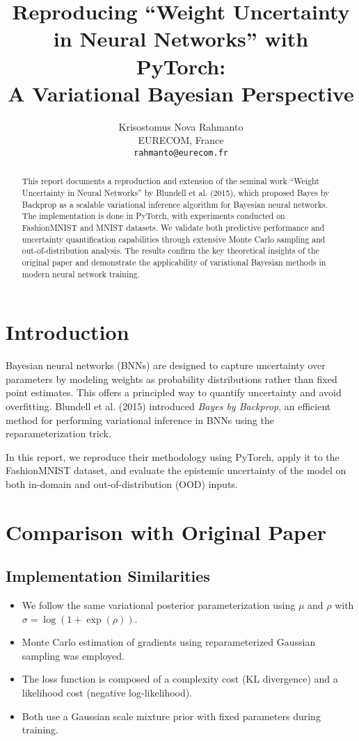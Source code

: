 \documentclass{article}
\title{Reproducing ``Weight Uncertainty in Neural Networks'' with PyTorch: \\ A Variational Bayesian Perspective}
\author{
  Krisostomus Nova Rahmanto \\
  EURECOM, France \\
  \texttt{rahmanto@eurecom.fr} \\
}
\begin{document}
\maketitle

\begin{abstract}
This report documents a reproduction and extension of the seminal work ``Weight Uncertainty in Neural Networks'' by Blundell et al. (2015), which proposed Bayes by Backprop as a scalable variational inference algorithm for Bayesian neural networks. The implementation is done in PyTorch, with experiments conducted on FashionMNIST and MNIST datasets. We validate both predictive performance and uncertainty quantification capabilities through extensive Monte Carlo sampling and out-of-distribution analysis. The results confirm the key theoretical insights of the original paper and demonstrate the applicability of variational Bayesian methods in modern neural network training.
\end{abstract}

\section{Introduction}

Bayesian neural networks (BNNs) are designed to capture uncertainty over parameters by modeling weights as probability distributions rather than fixed point estimates. This offers a principled way to quantify uncertainty and avoid overfitting. Blundell et al. (2015) introduced \textit{Bayes by Backprop}, an efficient method for performing variational inference in BNNs using the reparameterization trick.

In this report, we reproduce their methodology using PyTorch, apply it to the FashionMNIST dataset, and evaluate the epistemic uncertainty of the model on both in-domain and out-of-distribution (OOD) inputs.

\section{Comparison with Original Paper}

\subsection*{Implementation Similarities}
\begin{itemize}
  \item We follow the same variational posterior parameterization using $\mu$ and $\rho$ with $\sigma = \log(1 + \exp(\rho))$.
  \item Monte Carlo estimation of gradients using reparameterized Gaussian sampling was employed.
  \item The loss function is composed of a complexity cost (KL divergence) and a likelihood cost (negative log-likelihood).
  \item Both use a Gaussian scale mixture prior with fixed parameters during training.
\end{itemize}
\end{document}

